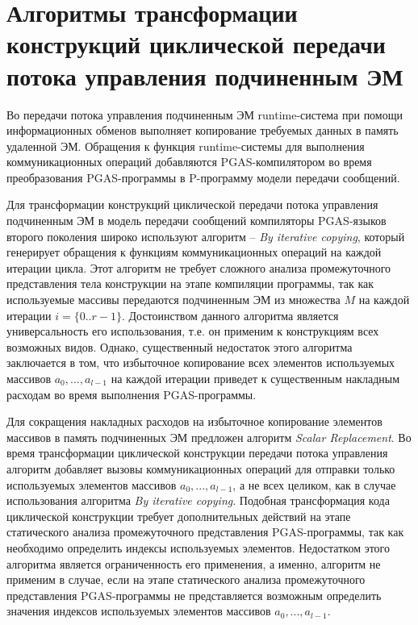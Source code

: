 \section{Алгоритмы трансформации конструкций циклической передачи потока управления подчиненным ЭМ}

Во передачи потока управления подчиненным ЭМ runtime-система при помощи информационных обменов выполняет копирование требуемых данных в память удаленной ЭМ. Обращения к функция runtime-системы для выполнения коммуникационных операций добавляются PGAS-компилятором во время преобразования PGAS-программы в P-программу модели передачи сообщений.

Для трансформации конструкций циклической передачи потока управления подчиненным ЭМ в модель передачи сообщений компиляторы PGAS-языков второго поколения широко используют алгоритм -- \textit{By iterative copying}, который генерирует обращения к функциям коммуникационных операций на каждой итерации цикла. Этот алгоритм не требует сложного анализа промежуточного представления тела конструкции на этапе компиляции программы, так как используемые массивы передаются подчиненным ЭМ из множества $M$ на каждой итерации $i=\{0..r-1\}$. Достоинством данного алгоритма является универсальность его использования, т.е. он применим к конструкциям всех возможных видов. Однако, существенный недостаток этого алгоритма заключается в том, что избыточное копирование всех элементов используемых массивов $a_{0},...,a_{l-1}$ на каждой итерации приведет к существенным накладным расходам во время выполнения PGAS-программы.

Для сокращения накладных расходов на избыточное копирование элементов массивов в память подчиненных ЭМ предложен алгоритм \textit{Scalar Replacement}. Во время трансформации циклической конструкции передачи потока управления алгоритм  добавляет вызовы коммуникационных операций для отправки только используемых элементов массивов $a_{0},...,a_{l-1}$, а не всех целиком, как в случае использования алгоритма \textit{By iterative copying}. Подобная трансформация кода циклической конструкции требует дополнительных действий на этапе статического анализа промежуточного представления PGAS-программы, так как необходимо определить индексы используемых элементов. Недостатком этого алгоритма является ограниченность его применения, а именно, алгоритм не применим в случае, если на этапе статического анализа промежуточного представления PGAS-программы не представляется возможным определить значения индексов используемых
элементов массивов $a_{0},...,a_{l-1}$.


